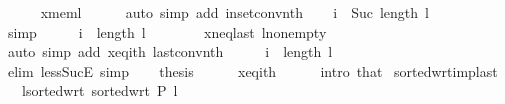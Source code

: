 \begin{isabellebody}
\ \ \ \ \isamarkupfalse%
\ x{\isacharunderscore}{\kern0pt}mem{\isacharunderscore}{\kern0pt}l\isanewline
\ \ \ \ \isamarkupfalse%
\ {\isacharparenleft}{\kern0pt}auto\ simp\ add{\isacharcolon}{\kern0pt}\ in{\isacharunderscore}{\kern0pt}set{\isacharunderscore}{\kern0pt}conv{\isacharunderscore}{\kern0pt}nth{\isacharparenright}{\kern0pt}\isanewline
\ \ \isamarkupfalse%
\ {\isachardoublequoteopen}i\ {\isacharless}{\kern0pt}\ Suc\ {\isacharparenleft}{\kern0pt}length\ l\ {\isacharminus}{\kern0pt}\ {}{\isacharparenright}{\kern0pt}{\isachardoublequoteclose}\isanewline
\ \ \ \ \isamarkupfalse%
\ simp\isanewline
\ \ \isamarkupfalse%
\ \isamarkupfalse%
\ {\isachardoublequoteopen}i\ {\isasymnoteq}\ length\ l\ {\isacharminus}{\kern0pt}\ {}{\isachardoublequoteclose}\isanewline
\ \ \ \ \isamarkupfalse%
\ x{\isacharunderscore}{\kern0pt}neq{\isacharunderscore}{\kern0pt}last\ l{\isacharunderscore}{\kern0pt}non{\isacharunderscore}{\kern0pt}empty\isanewline
\ \ \ \ \isamarkupfalse%
\ {\isacharparenleft}{\kern0pt}auto\ simp\ add{\isacharcolon}{\kern0pt}\ x{\isacharunderscore}{\kern0pt}eq{\isacharunderscore}{\kern0pt}ith\ last{\isacharunderscore}{\kern0pt}conv{\isacharunderscore}{\kern0pt}nth{\isacharparenright}{\kern0pt}\isanewline
\ \ \isamarkupfalse%
\ \isamarkupfalse%
\ {\isachardoublequoteopen}i\ {\isacharless}{\kern0pt}\ length\ l\ {\isacharminus}{\kern0pt}\ {}{\isachardoublequoteclose}\isanewline
\ \ \ \ \isamarkupfalse%
\ {\isacharparenleft}{\kern0pt}elim\ less{\isacharunderscore}{\kern0pt}SucE{\isacharparenright}{\kern0pt}\ simp{\isacharplus}{\kern0pt}\isanewline
\ \ \isamarkupfalse%
\ {\isacharquery}{\kern0pt}thesis\isanewline
\ \ \ \ \isamarkupfalse%
\ x{\isacharunderscore}{\kern0pt}eq{\isacharunderscore}{\kern0pt}ith\isanewline
\ \ \ \ \isamarkupfalse%
\ {\isacharparenleft}{\kern0pt}intro\ that{\isacharparenright}{\kern0pt}\isanewline
{}\isamarkupfalse%
%
\endisatagproof
{\isafoldproof}%
%
\isadelimproof
\isanewline
%
\endisadelimproof
\isanewline
{}\isamarkupfalse%
\ sorted{\isacharunderscore}{\kern0pt}wrt{\isacharunderscore}{\kern0pt}imp{\isacharunderscore}{\kern0pt}last{\isacharcolon}{\kern0pt}\isanewline
\ \ \ l{\isacharunderscore}{\kern0pt}sorted{\isacharunderscore}{\kern0pt}wrt{\isacharcolon}{\kern0pt}\ {\isachardoublequoteopen}sorted{\isacharunderscore}{\kern0pt}wrt\ P\ l{\isachardoublequoteclose}\isanewline

\end{isabellebody}
